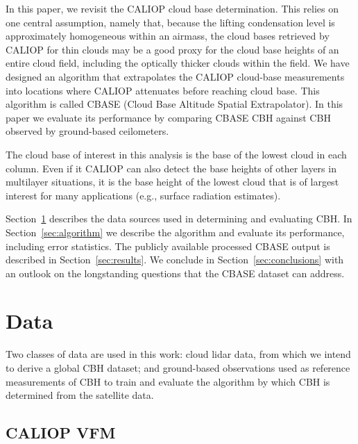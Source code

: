 \documentclass[essd,manuscript]{copernicus}\usepackage[]{graphicx}\usepackage[]{color}
\begin{document}
In this paper, we revisit the CALIOP cloud base determination.  This relies on
one central assumption, namely that, because the
lifting condensation level is approximately homogeneous within an airmass, the
cloud bases retrieved by CALIOP for thin clouds may be a good proxy for the cloud
base heights of an entire cloud field, including the optically thicker clouds
within the field.  
We have designed an algorithm that extrapolates the CALIOP
cloud-base measurements into locations where CALIOP attenuates before reaching
cloud base.  This algorithm is called CBASE (Cloud Base Altitude Spatial
Extrapolator).  In this paper we evaluate its performance by comparing CBASE
CBH against CBH observed by ground-based
ceilometers.

The cloud base of interest in this analysis is the base of the lowest cloud in
each column. Even if it CALIOP can also detect the base heights of other layers
in multilayer situations, it is the base height of the lowest cloud that is of
largest interest for many applications (e.g., surface radiation
estimates). 

Section~\ref{sec:data} describes the data sources used in determining and
evaluating CBH.  In Section~\ref{sec:algorithm} we describe
the algorithm and evaluate its performance, including error statistics.  The
publicly available processed CBASE output is described in
Section~\ref{sec:results}.  We conclude in Section~\ref{sec:conclusions} with an
outlook on the longstanding questions that the CBASE dataset can address.

\section{Data}
\label{sec:data}

Two classes of data are used in this work: cloud lidar data, from which we
intend to derive a global CBH dataset; and ground-based observations used as
reference measurements of CBH to train and evaluate the algorithm by which
CBH is determined from the satellite data.

\subsection{CALIOP VFM}
\end{document}
